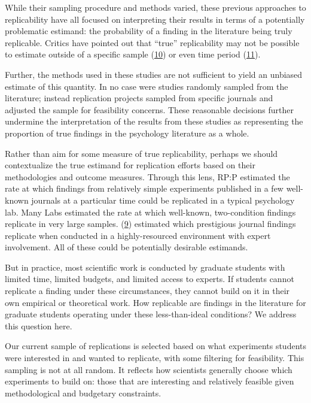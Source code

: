 \documentclass[
  english,
  a4paper,
]{article}
\begin{document}
While their sampling procedure and methods varied, these previous approaches to replicability have all focused on interpreting their results in terms of a potentially problematic estimand: the probability of a finding in the literature being truly replicable. Critics have pointed out that ``true'' replicability may not be possible to estimate outside of a specific sample (\protect\hyperlink{ref-vanbavel2016}{10}) or even time period (\protect\hyperlink{ref-ramscar2015}{11}).

Further, the methods used in these studies are not sufficient to yield an unbiased estimate of this quantity. In no case were studies randomly sampled from the literature; instead replication projects sampled from specific journals and adjusted the sample for feasibility concerns. These reasonable decisions further undermine the interpretation of the results from these studies as representing the proportion of true findings in the psychology literature as a whole.

Rather than aim for some measure of true replicability, perhaps we should contextualize the true estimand for replication efforts based on their methodologies and outcome measures. Through this lens, RP:P estimated the rate at which findings from relatively simple experiments published in a few well-known journals at a particular time could be replicated in a typical psychology lab. Many Labs estimated the rate at which well-known, two-condition findings replicate in very large samples. (\protect\hyperlink{ref-camerer2018}{9}) estimated which prestigious journal findings replicate when conducted in a highly-resourced environment with expert involvement. All of these could be potentially desirable estimands.

But in practice, most scientific work is conducted by graduate students with limited time, limited budgets, and limited access to experts. If students cannot replicate a finding under these circumstances, they cannot build on it in their own empirical or theoretical work. How replicable are findings in the literature for graduate students operating under these less-than-ideal conditions? We address this question here.

Our current sample of replications is selected based on what experiments students were interested in and wanted to replicate, with some filtering for feasibility. This sampling is not at all random. It reflects how scientists generally choose which experiments to build on: those that are interesting and relatively feasible given methodological and budgetary constraints.
\end{document}
